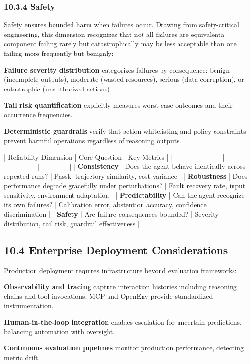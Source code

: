 \subsubsection{10.3.4 Safety}

Safety ensures bounded harm when failures occur. Drawing from safety-critical engineering, this dimension recognizes that not all failures are equivalenta component failing rarely but catastrophically may be less acceptable than one failing more frequently but benignly:

\textbf{Failure severity distribution} categorizes failures by consequence: benign (incomplete outputs), moderate (wasted resources), serious (data corruption), or catastrophic (unauthorized actions).

\textbf{Tail risk quantification} explicitly measures worst-case outcomes and their occurrence frequencies.

\textbf{Deterministic guardrails} verify that action whitelisting and policy constraints prevent harmful operations regardless of reasoning outputs.

| Reliability Dimension | Core Question | Key Metrics |
|----------------------|---------------|-------------|
| \textbf{Consistency} | Does the agent behave identically across repeated runs? | Passk, trajectory similarity, cost variance |
| \textbf{Robustness} | Does performance degrade gracefully under perturbations? | Fault recovery rate, input sensitivity, environment adaptation |
| \textbf{Predictability} | Can the agent recognize its own failures? | Calibration error, abstention accuracy, confidence discrimination |
| \textbf{Safety} | Are failure consequences bounded? | Severity distribution, tail risk, guardrail effectiveness |

\subsection{10.4 Enterprise Deployment Considerations}

Production deployment requires infrastructure beyond evaluation frameworks:

\textbf{Observability and tracing} capture interaction histories including reasoning chains and tool invocations. MCP and OpenEnv provide standardized instrumentation.

\textbf{Human-in-the-loop integration} enables escalation for uncertain predictions, balancing automation with oversight.

\textbf{Continuous evaluation pipelines} monitor production performance, detecting metric drift.

